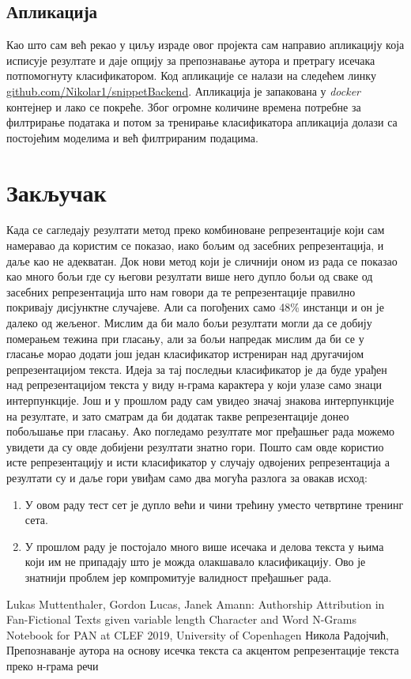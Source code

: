 \documentclass[11pt]{article}
\begin{document}
\subsection{Апликација}
Као што сам већ рекао у циљу израде овог пројекта сам направио апликацију која исписује резултате и даје опцију за препознавање аутора и претрагу исечака потпомогнуту класификатором. Код апликације се налази на следећем линку \href{https://github.com/Nikolar1/snippetBackend}{github.com/Nikolar1/snippetBackend}. Апликација је запакована у \emph{docker} контејнер и лако се покреће. Због огромне количине времена потребне за филтрирање података и потом за тренирање класификатора апликација долази са постојећим моделима и већ филтрираним подацима.
\newpage
\section{Закључак}
Када се сагледају резултати метод преко комбиноване репрезентације који сам намеравао да користим се показао, иако бољим од засебних репрезентација, и даље као не адекватан. Док нови метод који је сличнији оном из рада \cite{COP} се показао као много бољи где су његови резултати више него дупло бољи од сваке од засебних репрезентација што нам говори да те репрезентације правилно покривају дисјунктне случајеве. Али са погођених само 48\% инстанци и он је далеко од  жељеног. Мислим да би мало бољи резултати могли да се добију померањем тежина при гласању, али за бољи напредак мислим да би се у гласање морао додати још један класификатор истрениран над другачијом репрезентацијом текста. Идеја за тај последњи класификатор је да буде урађен над репрезентацијом текста у виду н-грама карактера у који улазе само знаци интерпункције. Још и у прошлом раду сам увидео значај знакова интерпункције на резултате, и зато сматрам да би додатак такве репрезентације донео побољшање при гласању. Ако погледамо резултате мог пређашњег рада \cite{MOJRAD} можемо увидети да су овде добијени резултати знатно гори. Пошто сам овде користио исте репрезентацију и исти класификатор у случају одвојених репрезентација а резултати су и даље гори увиђам само два могућа разлога за овакав исход:
\begin{enumerate} 
	\item У овом раду тест сет је дупло већи и чини трећину уместо четвртине тренинг сета.
	\item У прошлом раду је постојало  много више исечака и делова текста у њима који им не припадају што је можда олакшавало класификацију. Ово је знатнији проблем јер компромитује валидност пређашњег рада.
\end{enumerate}

\newpage
\begin{thebibliography}{9}
Lukas Muttenthaler, Gordon Lucas, Janek Amann: Authorship Attribution in Fan-Fictional Texts given variable length Character and Word N-Grams Notebook for PAN at CLEF 2019, University of Copenhagen
Никола Радојчић, Препознаванје аутора на основу исечка текста са акцентом репрезентације текста преко н-грама речи
\end{thebibliography}
\end{document}
